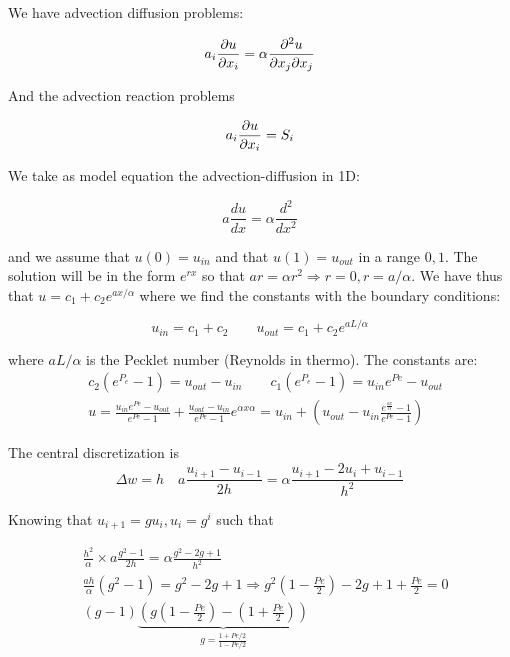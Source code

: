We have advection diffusion problems: 

\begin{equation}
a _i \frac{\partial u}{\partial x_i} = \alpha \frac{\partial ^2 u}{\partial x_j \partial x_j}
\end{equation}

And the advection reaction problems

\begin{equation}
a_i \frac{\partial u}{\partial x_i} = S_i
\end{equation}

We take as model equation the advection-diffusion in 1D: 

\begin{equation}
a \frac{du}{dx} = \alpha \frac{d^2}{dx^2}
\end{equation}

and we assume that $u(0)= u_{in}$ and that $u(1) = u_{out}$ in a range $0,1$. The solution will be in the form $e^{rx}$ so that $ar = \alpha r^2\Rightarrow r = 0, r = a/\alpha$. We have thus that $u = c_1 + c_2 e^{ax/\alpha}$ where we find the constants with the boundary conditions: 

\begin{equation}
u_{in} = c_1 + c_2 \qquad u_{out} = c_1 + c_2e^{aL/\alpha}
\end{equation} 

where $aL/\alpha$ is the Pecklet number (Reynolds in thermo). The constants are: 
\begin{equation}
\begin{aligned}
&c_2(e^{P_e}-1) = u_{out} - u_{in} \qquad c_1(e^{P_e}-1) = u_{in}e^{Pe} - u_{out} \\ 
&u = \frac{u_{in}e^{Pe}-u_{out}}{e^{Pe}-1}+ \frac{u_{out}-u_{in}}{e^{Pe}-1}e^{\alpha x	\alpha} = u_{in} + (u_{out}-u_{in} \frac{e^{\frac{ax}{\alpha}}-1}{e^{Pe}-1})
\end{aligned}
\end{equation}

The central discretization is 
\begin{equation}
\Delta w = h \quad a\frac{u_{i+1}-u_{i-1}}{2h} = \alpha \frac{u_{i+1}-2u_i+u_{i-1}}{h^2}
\end{equation}

Knowing that $u_{i+1}= gu_i, u_i = g^i$ such that 

\begin{equation}
\begin{aligned}
&\frac{h^2}{\alpha} \times a\frac{g^2-1}{2h} = \alpha \frac{g^2 - 2 g +1}{h^2}\\
&\frac{ah}{\alpha} (g^2-1) = g^2 -2g +1 \Rightarrow g^2 (1- \frac{Pe}{2})-2g + 1 + \frac{Pe}{2} = 0\\
&(g-1)\underbrace{(g(1-\frac{Pe}{2})-(1+\frac{Pe}{2}))}_{g = \frac{1+Pe/2}{1-Pe/2}}
\end{aligned}
\end{equation}

